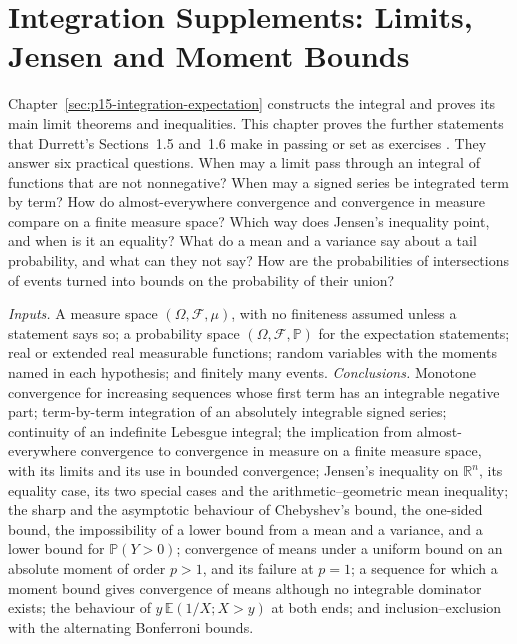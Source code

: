 \chapter{Integration Supplements: Limits, Jensen and Moment Bounds}
\label{sec:p15-w02c-p15-005-integration-supplements}

Chapter~\ref{sec:p15-integration-expectation} constructs the integral
and proves its main limit theorems and inequalities. This chapter
proves the further statements that Durrett's Sections~1.5 and~1.6 make
in passing or set as exercises \cite[pp.~26--37]{DurrettPTEAuthor2019}.
They answer six practical questions. When may a limit pass through an
integral of functions that are not nonnegative? When may a signed series
be integrated term by term? How do almost-everywhere convergence and
convergence in measure compare on a finite measure space? Which way
does Jensen's inequality point, and when is it an equality? What do a
mean and a variance say about a tail probability, and what can they not
say? How are the probabilities of intersections of events turned into
bounds on the probability of their union?

\emph{Inputs.} A measure space \((\Omega,\mathcal F,\mu)\), with no
finiteness assumed unless a statement says so; a probability space
\((\Omega,\mathcal F,\mathbb P)\) for the expectation statements; real
or extended real measurable functions; random variables with the
moments named in each hypothesis; and finitely many events.
\emph{Conclusions.} Monotone convergence for increasing sequences whose
first term has an integrable negative part; term-by-term integration of
an absolutely integrable signed series; continuity of an indefinite
Lebesgue integral; the implication from almost-everywhere convergence to
convergence in measure on a finite measure space, with its limits and
its use in bounded convergence; Jensen's inequality on \(\mathbb R^n\), its equality case, its two
special cases and the arithmetic--geometric mean inequality; the sharp
and the asymptotic behaviour of Chebyshev's bound, the one-sided bound,
the impossibility of a lower bound from a mean and a variance, and a
lower bound for \(\mathbb P(Y>0)\); convergence of means under a
uniform bound on an absolute moment of order \(p>1\), and its failure
at \(p=1\); a sequence for which a moment bound
gives convergence of means although no integrable dominator exists;
the behaviour of \(y\,\mathbb E(1/X;X>y)\) at both ends; and
inclusion--exclusion with the alternating Bonferroni bounds.

